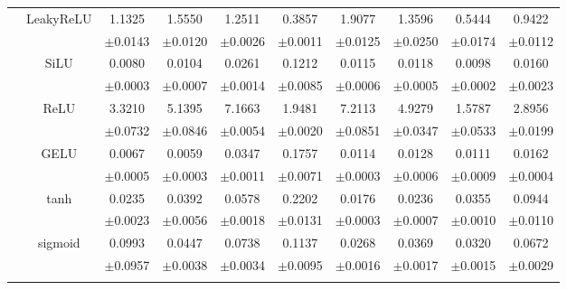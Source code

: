 \documentclass{article}
\begin{document}
\begin{longtable}[h!]{cccccccccc}
        & \multirow{2}{*}{LeakyReLU}
        &1.1325 & 1.5550 & 1.2511 & 0.3857 & 1.9077 & 1.3596 & 0.5444 & 0.9422\\
        &&\scriptsize $\pm$0.0143&\scriptsize$\pm$0.0120&\scriptsize$\pm$0.0026&\scriptsize$\pm$0.0011&\scriptsize$\pm$0.0125&\scriptsize$\pm$0.0250&\scriptsize$\pm$0.0174&\scriptsize$\pm$0.0112\\

        \hline\rule{0pt}{2.3ex}

        \multirow{14}{*}{\textsf{MAE\textsubscript{nf}}} 
        & \multirow{2}{*}{SiLU}
        & {0.0080} & {0.0104} & {0.0261} & {0.1212} & {0.0115} & {0.0118} & {0.0098} & {0.0160} \\
        && \scriptsize {$\pm$0.0003} & \scriptsize {$\pm$0.0007} & \scriptsize {$\pm$0.0014} & \scriptsize {$\pm$0.0085} & \scriptsize {$\pm$0.0006} & \scriptsize {$\pm$0.0005} & \scriptsize {$\pm$0.0002} & \scriptsize {$\pm$0.0023}\\
        \cline{3-10}\rule{0pt}{2.3ex}

        & \multirow{2}{*}{ReLU}
        &3.3210 & 5.1395 & 7.1663 & 1.9481 & 7.2113 & 4.9279 & 1.5787 & 2.8956\\
        &&\scriptsize $\pm$0.0732&\scriptsize$\pm$0.0846&\scriptsize$\pm$0.0054&\scriptsize$\pm$0.0020&\scriptsize$\pm$0.0851&\scriptsize$\pm$0.0347&\scriptsize$\pm$0.0533&\scriptsize$\pm$0.0199\\
        \cline{3-10}\rule{0pt}{2.3ex}

        & \multirow{2}{*}{GELU}
        &0.0067 & 0.0059 & 0.0347 & 0.1757 & 0.0114 & 0.0128 & 0.0111 & 0.0162\\
        &&\scriptsize $\pm$0.0005&\scriptsize$\pm$0.0003&\scriptsize$\pm$0.0011&\scriptsize$\pm$0.0071&\scriptsize$\pm$0.0003&\scriptsize$\pm$0.0006&\scriptsize$\pm$0.0009&\scriptsize$\pm$0.0004\\
        \cline{3-10}\rule{0pt}{2.3ex}


        & \multirow{2}{*}{tanh}
        &0.0235 & 0.0392 & 0.0578 & 0.2202 & 0.0176 & 0.0236 & 0.0355 & 0.0944\\
        &&\scriptsize $\pm$0.0023&\scriptsize$\pm$0.0056&\scriptsize$\pm$0.0018&\scriptsize$\pm$0.0131&\scriptsize$\pm$0.0003&\scriptsize$\pm$0.0007&\scriptsize$\pm$0.0010&\scriptsize$\pm$0.0110\\
        \cline{3-10}\rule{0pt}{2.3ex}

        & \multirow{2}{*}{sigmoid}
        &0.0993 & 0.0447 & 0.0738 & 0.1137 & 0.0268 & 0.0369 & 0.0320 & 0.0672\\
        &&\scriptsize $\pm$0.0957&\scriptsize$\pm$0.0038&\scriptsize$\pm$0.0034&\scriptsize$\pm$0.0095&\scriptsize$\pm$0.0016&\scriptsize$\pm$0.0017&\scriptsize$\pm$0.0015&\scriptsize$\pm$0.0029\\
        \cline{3-10}\rule{0pt}{2.3ex}


\end{longtable}
\end{document}
